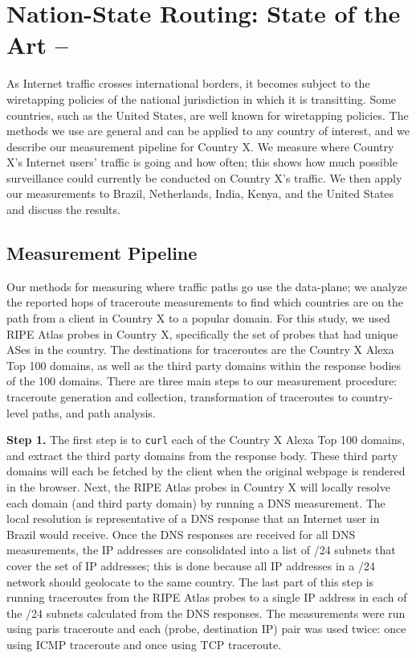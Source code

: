 \section{Nation-State Routing: State of the Art -- }
\label{measure}

As Internet traffic crosses international borders, it becomes subject to the wiretapping policies of the national jurisdiction in which it is transitting.  Some countries, such as the United States, are well known for wiretapping policies.  The methods we use are general and can be applied to any country of interest, and we describe our measurement pipeline for Country X. We measure where Country X's Internet users' traffic is going and how often; this shows how much possible surveillance could currently be conducted on Country X's traffic.  We then apply our measurements to Brazil, Netherlands, India, Kenya, and the United States and discuss the results.

\subsection{Measurement Pipeline}
Our methods for measuring where traffic paths go use the data-plane; we analyze the reported hops of traceroute measurements to find which countries are on the path from a client in Country X to a popular domain.  For this study, we used RIPE Atlas probes in Country X, specifically the set of probes that had unique ASes in the country.  The destinations for traceroutes are the Country X Alexa Top 100 domains, as well as the third party domains within the response bodies of the 100 domains.  There are three main steps to our measurement procedure: traceroute generation and collection, transformation of traceroutes to country-level paths, and path analysis.

{\bf Step 1.} The first step is to {\tt curl} each of the Country X Alexa Top 100 domains, and extract the third party domains from the response body.  These third party domains will each be fetched by the client when the original webpage is rendered in the browser.  Next, the RIPE Atlas probes in Country X will locally resolve each domain (and third party domain) by running a DNS measurement.  The local resolution is representative of a DNS response that an Internet user in Brazil would receive.  Once the DNS responses are received for all DNS measurements, the IP addresses are consolidated into a list of /24 subnets that cover the set of IP addresses; this is done because all IP addresses in a /24 network should geolocate to the same country.  The last part of this step is running traceroutes from the RIPE Atlas probes to a single IP address in each of the /24 subnets calculated from the DNS responses.  The measurements were run using paris traceroute and each (probe, destination IP) pair was used twice: once using ICMP traceroute and once using TCP traceroute.  


